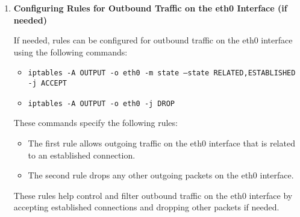 {\begin{enumerate}
\begin{enumerate}
				These commands specify the following rules:
				
				\begin{itemize}
					\item The first rule allows incoming traffic on the eth0 interface that is related to an established connection.
					\item The second rule allows incoming TCP packets with the SYN flag set (indicating the start of a new connection) at a maximum rate of 3 per second.
					\item The third rule drops any remaining incoming packets on the eth0 interface.
				\end{itemize}
				
				These rules help control and filter inbound traffic on the eth0 interface by accepting established connections and limiting the rate of new TCP connections while dropping other packets.
				\item \textbf{Configuring Rules for Outbound Traffic on the eth0 Interface (if needed)}
				
				If needed, rules can be configured for outbound traffic on the eth0 interface using the following commands:
			\begin{sloppypar}	
			\begin{itemize}
				\item \texttt{iptables -A OUTPUT -o eth0 -m state --state RELATED,ESTABLISHED -j ACCEPT}
				\item \texttt{iptables -A OUTPUT -o eth0 -j DROP}
			\end{itemize}
			\end{sloppypar}	
				These commands specify the following rules:
				
				\begin{itemize}
					\item The first rule allows outgoing traffic on the eth0 interface that is related to an established connection.
					\item The second rule drops any other outgoing packets on the eth0 interface.
				\end{itemize}
				
				These rules help control and filter outbound traffic on the eth0 interface by accepting established connections and dropping other packets if needed.
			\end{enumerate}
	\end{enumerate}}
		
